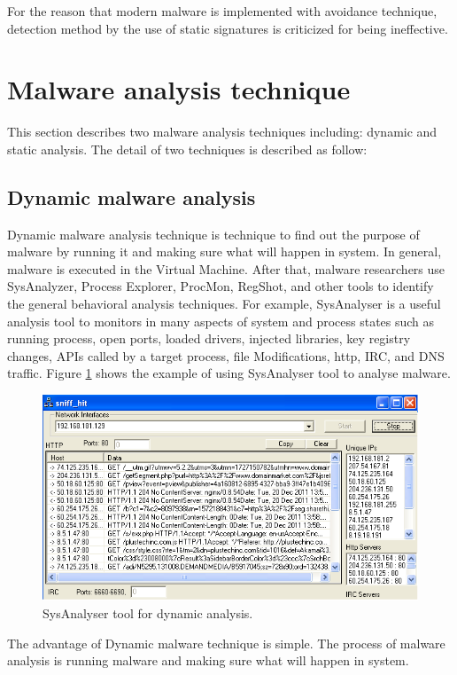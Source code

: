 For the reason that modern malware is implemented with avoidance technique, detection method by the use of static signatures is criticized for being ineffective.   
\section{Malware analysis technique}
This section describes two malware analysis techniques including: dynamic and static analysis. The detail of two techniques is described as follow: 
\subsection{Dynamic malware analysis}
Dynamic malware analysis technique is technique to find out the purpose of malware by running it and making sure what will happen in system. In general, malware is executed in the Virtual Machine. After that, malware researchers use SysAnalyzer, Process Explorer, ProcMon, RegShot, and other tools to identify the general behavioral analysis techniques. For example, SysAnalyser is a useful analysis tool to monitors in many aspects of system and process states such as running process, open ports, loaded drivers, injected libraries, key registry changes, APIs called by a target process, file Modifications, http, IRC, and DNS traffic. Figure \ref{fig:SysAnalyser} shows the example of using SysAnalyser tool to analyse malware. 


\begin{figure}[h!]
\centering
\includegraphics[width=1\textwidth]{graph/SysAnalyser.png}
\caption{SysAnalyser tool for dynamic analysis.}
\label{fig:SysAnalyser}
\end{figure}

The advantage of Dynamic malware technique is simple. The process of malware analysis is running malware and making sure what will happen in 
system.

